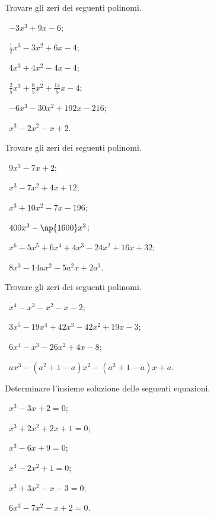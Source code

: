 \begin{esercizio}[\Ast]
 \label{ese:5.3}
Trovare gli zeri dei seguenti polinomi.
\begin{multicols}{2}
 \begin{enumeratea}
 \item~$-3x^3+9x-6$;
 \item~$\frac 1 2x^3-3x^2+6x-4$;
 \item~$4x^3+4x^2-4x-4$;
 \item~$\frac 2 5x^3+\frac 8 5x^2+\frac{14} 5x-4$;
 \item~$-6x^3-30x^2+192x-216$;
 \item~$x^3-2x^2-x+2$.
 \end{enumeratea}
 \end{multicols}
\end{esercizio}

\begin{esercizio}[\Ast]
 \label{ese:5.4}
Trovare gli zeri dei seguenti polinomi.
\begin{multicols}{2}
 \begin{enumeratea}
 \item~$9x^3-7x+2$;
 \item~$x^3-7x^2+4x+12$;
 \item~$ x^3+10x^2-7x-196 $;
 \item~$ 400x^3-\np{1600}x^2$;
 \item~$x^6-5x^5+6x^4+4x^3-24x^2+16x+32 $;
 \item~$ 8x^3-14{ax}^2-5a^2x+2a^3 $.
 \end{enumeratea}
 \end{multicols}
\end{esercizio}

\begin{esercizio}
\label{ese:5.5}
Trovare gli zeri dei seguenti polinomi.
\begin{multicols}{2}
 \begin{enumeratea}
 \item~$ x^4-x^3-x^2-x-2$;
 \item~$ 3x^5-19x^4+42x^3-42x^2+19x-3$;
 \item~$ 6x^4-x^3-26x^2+4x-8$;
 \item~$ {ax}^3-(a^2+1-a)x^2-(a^2+1-a)x+a$.
 \end{enumeratea}
 \end{multicols}
\end{esercizio}

\begin{esercizio}[\Ast]
\label{ese:5.6}
Determinare l'insieme soluzione delle seguenti equazioni.
\begin{multicols}{2}
 \begin{enumeratea}
 \item~$x^3-3x+2=0$;
 \item~$x^3+2x^2+2x+1=0$;
 \item~$x^3-6x+9=0$;
 \item~$x^4-2x^2+1=0$;
 \item~$x^3+3x^2-x-3=0$;
 \item~$6x^3-7x^2-x+2=0$.
 \end{enumeratea}
 \end{multicols}
\end{esercizio}

